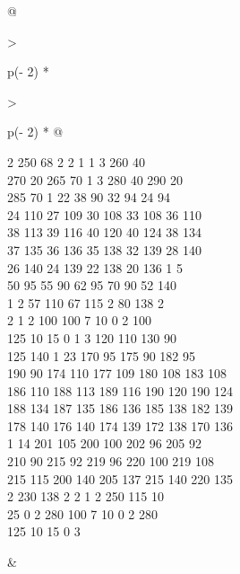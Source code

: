 \begin{question}
\begin{longtable}[]{@{}

  >{\raggedright\arraybackslash}p{(\columnwidth - 2\tabcolsep) * }

  >{\raggedright\arraybackslash}p{(\columnwidth - 2\tabcolsep) * }@{}}
\begin{minipage}[t]{\linewidth}
2 250 68 2 2 1 1 3 260 40\\

270 20 265 70 1 3 280 40 290 20\\

285 70 1 22 38 90 32 94 24 94\\

24 110 27 109 30 108 33 108 36 110\\

38 113 39 116 40 120 40 124 38 134\\

37 135 36 136 35 138 32 139 28 140\\

26 140 24 139 22 138 20 136 1 5\\

50 95 55 90 62 95 70 90 52 140\\

1 2 57 110 67 115 2 80 138 2\\

2 1 2 100 100 7 10 0 2 100\\

125 10 15 0 1 3 120 110 130 90\\

125 140 1 23 170 95 175 90 182 95\\

190 90 174 110 177 109 180 108 183 108\\

186 110 188 113 189 116 190 120 190 124\\

188 134 187 135 186 136 185 138 182 139\\

178 140 176 140 174 139 172 138 170 136\\

1 14 201 105 200 100 202 96 205 92\\

210 90 215 92 219 96 220 100 219 108\\

215 115 200 140 205 137 215 140 220 135\\

2 230 138 2 2 1 2 250 115 10\\

25 0 2 280 100 7 10 0 2 280\\

125 10 15 0 3\strut

\end{minipage} & \begin{minipage}[t]{\linewidth}\raggedright


\end{minipage}
\end{longtable}
\end{question}
